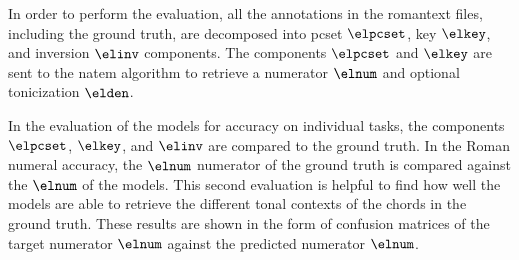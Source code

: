 
In order to perform the evaluation, all the annotations in
the \gls{romantext} files, including the ground truth, are
decomposed into \gls{pcset} $\elpcset$, key $\elkey$, and
inversion $\elinv$ components. The components $\elpcset$ and
$\elkey$ are sent to the \gls{natem} algorithm to retrieve a
numerator $\elnum$ and optional tonicization $\elden$.

In the evaluation of the models for accuracy on individual
tasks, the components $\elpcset$, $\elkey$, and $\elinv$ are
compared to the ground truth. In the Roman numeral accuracy,
the $\elnum$ numerator of the ground truth is compared
against the $\elnum$ of the models. This second evaluation
is helpful to find how well the models are able to retrieve
the different tonal contexts of the chords in the ground
truth. These results are shown in the form of confusion
matrices of the target numerator $\elnum$ against the
predicted numerator $\elnum$.


